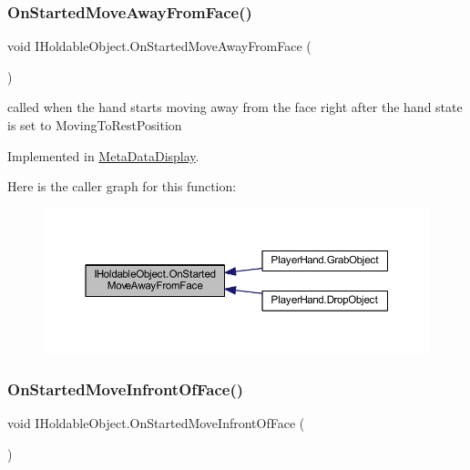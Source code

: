 \subsubsection{\texorpdfstring{On\+Started\+Move\+Away\+From\+Face()}{OnStartedMoveAwayFromFace()}}
{\footnotesize\ttfamily void I\+Holdable\+Object.\+On\+Started\+Move\+Away\+From\+Face (\begin{DoxyParamCaption}{ }\end{DoxyParamCaption})}



called when the hand starts moving away from the face right after the hand state is set to Moving\+To\+Rest\+Position 



Implemented in \mbox{\hyperlink{class_meta_data_display_a98518b3d82ffd1e428cab9a2328fb018}{Meta\+Data\+Display}}.

Here is the caller graph for this function\+:
\nopagebreak
\begin{figure}[H]
\begin{center}
\leavevmode
\includegraphics[width=350pt]{interface_i_holdable_object_a75f802a9736db51e5e8d1568689dd11c_icgraph}
\end{center}
\end{figure}
\mbox{\label{interface_i_holdable_object_af5dcdd5524539104706dadd8a0e15e08}} 
\subsubsection{\texorpdfstring{On\+Started\+Move\+Infront\+Of\+Face()}{OnStartedMoveInfrontOfFace()}}
{\footnotesize\ttfamily void I\+Holdable\+Object.\+On\+Started\+Move\+Infront\+Of\+Face (\begin{DoxyParamCaption}{ }\end{DoxyParamCaption})}




